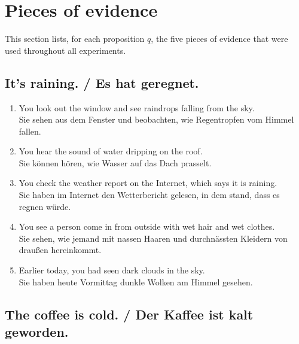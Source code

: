 \documentclass[11pt]{article}
\begin{document}
\appendix

\section{Pieces of evidence}
\label{sec:evidence}

This section lists, for each proposition $q$, the five pieces of evidence that were used throughout all experiments.

\subsection{It's raining. / Es hat geregnet.}

\begin{enumerate}
	\item You look out the window and see raindrops falling from the sky. \\ Sie sehen aus dem Fenster und beobachten, wie Regentropfen vom Himmel fallen. 
	\item You hear the sound of water dripping on the roof. \\ Sie können hören, wie Wasser auf das Dach prasselt.
	\item You check the weather report on the Internet, which says it is raining. \\ Sie haben im Internet den Wetterbericht gelesen, in dem stand, dass es regnen würde. 
	\item You see a person come in from outside with wet hair and wet clothes. \\ Sie sehen, wie jemand mit nassen Haaren und durchnässten Kleidern von draußen hereinkommt.
	\item Earlier today, you had seen dark clouds in the sky. \\ Sie haben heute Vormittag dunkle Wolken am Himmel gesehen.
\end{enumerate}

\subsection{The coffee is cold. / Der Kaffee ist kalt geworden.}
\end{document}
